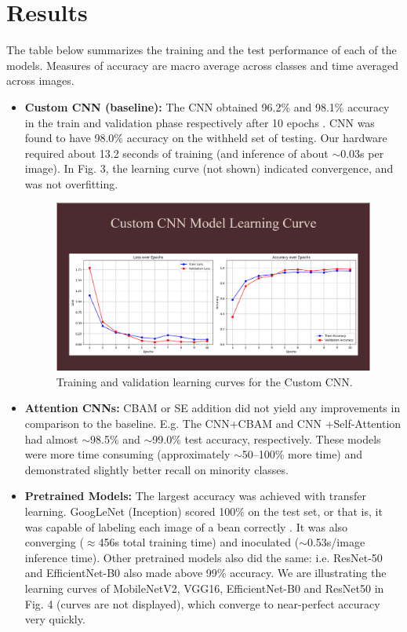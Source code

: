 \documentclass[conference]{IEEEtran}
\begin{document}
\section{Results}
The table below summarizes the training and the test performance of each of the models. Measures of accuracy are macro average across classes and time averaged across images.

\begin{itemize}
    \item \textbf{Custom CNN (baseline):} The CNN obtained 96.2\% and 98.1\% accuracy in the train and validation phase respectively after 10 epochs \cite{OurResults2025}. CNN was found to have 98.0\% accuracy on the withheld set of testing. Our hardware required about 13.2 seconds of training (and inference of about $\sim$0.03s per image). In Fig. 3, the learning curve (not shown) indicated convergence, and was not overfitting.

    \begin{figure}[htbp]
    \centering
    \includegraphics[scale=0.2]{cnn_learning_curve.png}
    \caption{Training and validation learning curves for the Custom CNN.}
    \label{fig: cnn_learning_curve}
\end{figure}
    
    \item \textbf{Attention CNNs:} CBAM or SE addition did not yield any improvements in comparison to the baseline. E.g. The CNN+CBAM and CNN +Self-Attention had almost $\sim$98.5\% and $\sim$99.0\% test accuracy, respectively. These models were more time consuming (approximately $\sim$50--100\% more time) and demonstrated slightly better recall on minority classes.

    \item \textbf{Pretrained Models:} The largest accuracy was achieved with transfer learning. GoogLeNet (Inception) scored 100\% on the test set, or that is, it was capable of labeling each image of a bean correctly \cite{Hassan2024}. It was also converging ($\approx$456s total training time) and inoculated ($\sim$0.53s/image inference time). Other pretrained models also did the same: i.e. ResNet-50 and EfficientNet-B0 also made above 99\% accuracy. We are illustrating the learning curves of MobileNetV2, VGG16, EfficientNet-B0 and ResNet50 in Fig. 4 (curves are not displayed), which converge to near-perfect accuracy very quickly.


\end{itemize}
\end{document}
